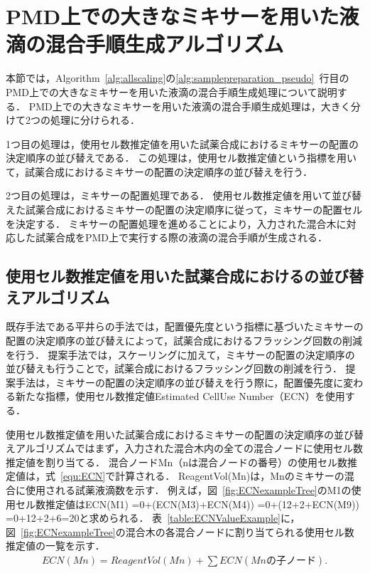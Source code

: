 \section{PMD上での大きなミキサーを用いた液滴の混合手順生成アルゴリズム}
本節では，Algorithm~\ref{alg:allscaling}の\ref{alg:samplepreparation_pseudo}~行目のPMD上での大きなミキサーを用いた液滴の混合手順生成処理について説明する．
PMD上での大きなミキサーを用いた液滴の混合手順生成処理は，大きく分けて2つの処理に分けられる．

1つ目の処理は，使用セル数推定値を用いた試薬合成におけるミキサーの配置の決定順序の並び替えである．
この処理は，使用セル数推定値という指標を用いて，試薬合成におけるミキサーの配置の決定順序の並び替えを行う．

2つ目の処理は，ミキサーの配置処理である．
使用セル数推定値を用いて並び替えた試薬合成におけるミキサーの配置の決定順序に従って，ミキサーの配置セルを決定する．
ミキサーの配置処理を進めることにより，入力された混合木に対応した試薬合成をPMD上で実行する際の液滴の混合手順が生成される．

\subsection{使用セル数推定値を用いた試薬合成におけるの並び替えアルゴリズム}
既存手法である平井らの手法では，配置優先度という指標に基づいたミキサーの配置の決定順序の並び替えによって，試薬合成におけるフラッシング回数の削減を行う．
提案手法では，スケーリングに加えて，ミキサーの配置の決定順序の並び替えも行うことで，試薬合成におけるフラッシング回数の削減を行う．
提案手法は，ミキサーの配置の決定順序の並び替えを行う際に，配置優先度に変わる新たな指標，使用セル数推定値Estimated CellUse Number（ECN）を使用する．

使用セル数推定値を用いた試薬合成におけるミキサーの配置の決定順序の並び替えアルゴリズムではまず，入力された混合木内の全ての混合ノードに使用セル数推定値を割り当てる．
混合ノードMn（nは混合ノードの番号）の使用セル数推定値は，式~\ref{equ:ECN}で計算される．
ReagentVol(Mn)は，Mnのミキサーの混合に使用される試薬液滴数を示す．
例えば，図~\ref{fig:ECNexampleTree}のM1の使用セル数推定値はECN(M1) =0+(ECN(M3)+ECN(M4)) =0+(12+2+ECN(M9)) =0+12+2+6=20と求められる．
表~\ref{table:ECNValueExample}に，図~\ref{fig:ECNexampleTree}の混合木の各混合ノードに割り当てられる使用セル数推定値の一覧を示す．
\begin{align}
    ECN(Mn)= ReagentVol(Mn) + \sum ECN(Mnの子ノード).
\label{equ:ECN}
\end{align}

